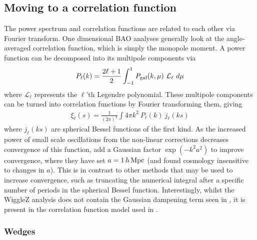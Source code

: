 \documentclass[titlesmallcaps, examinerscopy, copyrightpage]{uqthesis}
\begin{document}
\subsection{Moving to a correlation function} \label{sec:prior:cor}

The power spectrum and correlation functions are related to each other via Fourier transform. One dimensional BAO analyses generally look at the angle-averaged correlation function, which is simply the monopole moment. A power function can be decomposed into its multipole components via 
\begin{align}
P_{\ell}(k) = \frac{2\ell + 1}{2} \int_{-1}^1 P_{\rm{gal}}(k, \mu) \ \mathcal{L}_\ell \  d\mu
\end{align}
where $\mathcal{L}_\ell$ represents the $\ell$'th Legendre polynomial. These multipole components can be turned into correlation functions by Fourier transforming them, giving
\begin{align}
\xi_\ell(s) = \frac{1}{(2\pi)^3} \int 4\pi k^2 \ P_\ell(k) \ j_\ell(ks)
\end{align}
where $j_\ell(ks)$ are spherical Bessel functions of the first kind. As the increased power of small scale oscillations from the non-linear corrections decreases convergence of this function,  \citet{AndersonAubourg2012} add a Gaussian factor $\exp(-k^2 a^2)$ to improve convergence, where they have set $a= 1\, h\, \rm{Mpc}$ (and found cosmology insensitive to changes in $a$). This is in contrast to other methods that may be used to increase convergence, such as truncating the numerical integral after a specific number of periods in the spherical Bessel function. Interestingly, whilst the \citet{BlakeDavis2011} WiggleZ analysis does not contain the Gaussian dampening term seen in \citet{AndersonAubourg2012}, it is present in the correlation function model used in \citet{BlakeKazin2011}.

\subsubsection{Wedges} \label{sec:prior:cor:wedge}
\end{document}
